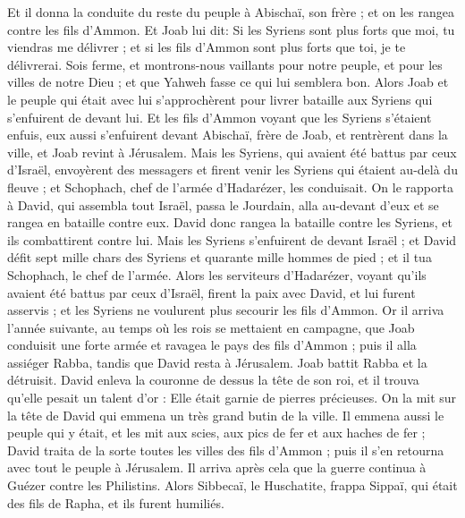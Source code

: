 \begin{multicols}{2}
Et il donna la conduite du reste du peuple à Abischaï, son frère ; et on les rangea contre les fils d'Ammon.
Et Joab lui dit: Si les Syriens sont plus forts que moi, tu viendras me délivrer ; et si les fils d'Ammon sont plus forts que toi, je te délivrerai.
Sois ferme, et montrons-nous vaillants pour notre peuple, et pour les villes de notre Dieu ; et que Yahweh fasse ce qui lui semblera bon.
Alors Joab et le peuple qui était avec lui s'approchèrent pour livrer bataille aux Syriens qui s'enfuirent de devant lui.
Et les fils d'Ammon voyant que les Syriens s'étaient enfuis, eux aussi s'enfuirent devant Abischaï, frère de Joab, et rentrèrent dans la ville, et Joab revint à Jérusalem.
Mais les Syriens, qui avaient été battus par ceux d'Israël, envoyèrent des messagers et firent venir les Syriens qui étaient au-delà du fleuve ; et Schophach, chef de l'armée d'Hadarézer, les conduisait.
On le rapporta à David, qui assembla tout Israël, passa le Jourdain, alla au-devant d'eux et se rangea en bataille contre eux. David donc rangea la bataille contre les Syriens, et ils combattirent contre lui.
Mais les Syriens s'enfuirent de devant Israël ; et David défit sept mille chars des Syriens et quarante mille hommes de pied ; et il tua Schophach, le chef de l'armée.
Alors les serviteurs d'Hadarézer, voyant qu'ils avaient été battus par ceux d'Israël, firent la paix avec David, et lui furent asservis ; et les Syriens ne voulurent plus secourir les fils d'Ammon.
\VerseOne{}Or il arriva l'année suivante, au temps où les rois se mettaient en campagne, que Joab conduisit une forte armée et ravagea le pays des fils d'Ammon ; puis il alla assiéger Rabba, tandis que David resta à Jérusalem. Joab battit Rabba et la détruisit.
David enleva la couronne de dessus la tête de son roi, et il trouva qu'elle pesait un talent d'or : Elle était garnie de pierres précieuses. On la mit sur la tête de David qui emmena un très grand butin de la ville.
Il emmena aussi le peuple qui y était, et les mit aux scies, aux pics de fer et aux haches de fer ; David traita de la sorte toutes les villes des fils d'Ammon ; puis il s'en retourna avec tout le peuple à Jérusalem.
Il arriva après cela que la guerre continua à Guézer contre les Philistins. Alors Sibbecaï, le Huschatite, frappa Sippaï, qui était des fils de Rapha, et ils furent humiliés.

\end{multicols}
